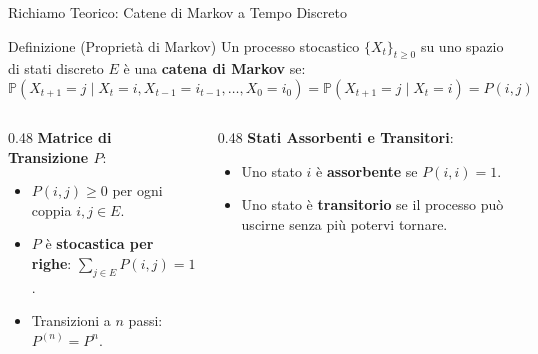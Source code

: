\documentclass[10pt, aspectratio=169]{beamer}
\begin{document}
\begin{frame}{Richiamo Teorico: Catene di Markov a Tempo Discreto}
    \begin{block}{Definizione (Proprietà di Markov)}
        Un processo stocastico $\{X_t\}_{t \ge 0}$ su uno spazio di stati discreto $E$ è una \textbf{catena di Markov} se:
        \[ \mathbb{P}(X_{t+1} = j \mid X_t = i, X_{t-1} = i_{t-1}, \dots, X_0 = i_0) = \mathbb{P}(X_{t+1} = j \mid X_t = i) = P(i,j) \]
    \end{block}

    \begin{columns}[T]
        \begin{column}{0.48\textwidth}
            \textbf{Matrice di Transizione $P$}:
            \begin{itemize}
                \item $P(i,j) \ge 0$ per ogni coppia $i, j \in E$.
                \item $P$ è \textbf{stocastica per righe}: $\sum_{j \in E} P(i,j) = 1$.
                \item Transizioni a $n$ passi: $P^{(n)} = P^n$.
            \end{itemize}
        \end{column}
        \begin{column}{0.48\textwidth}
            \textbf{Stati Assorbenti e Transitori}:
            \begin{itemize}
                \item Uno stato $i$ è \textbf{assorbente} se $P(i,i) = 1$.
                \item Uno stato è \textbf{transitorio} se il processo può uscirne senza più potervi tornare.
            \end{itemize}
        \end{column}
    \end{columns}

\end{frame}
\end{document}
